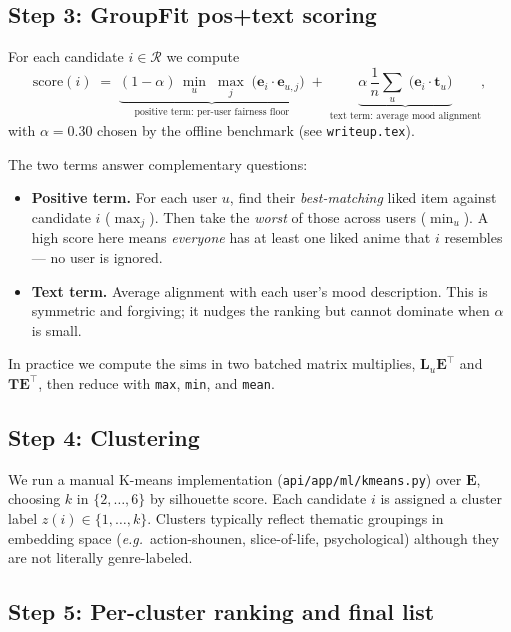 \documentclass[11pt]{article}
\begin{document}
\subsection{Step 3: GroupFit pos+text scoring}

For each candidate $i \in \mathcal{R}$ we compute
\begin{equation}
  \mathrm{score}(i) \;=\;
  \underbrace{(1 - \alpha)\,\min_{u}\;\max_{j}\;\bigl(\mathbf{e}_i \cdot \mathbf{e}_{u,j}\bigr)}_{\text{positive term: per-user fairness floor}}
  \;+\;
  \underbrace{\alpha\,\frac{1}{n}\sum_{u}\;\bigl(\mathbf{e}_i \cdot \mathbf{t}_u\bigr)}_{\text{text term: average mood alignment}},
  \label{eq:groupfit}
\end{equation}
with $\alpha = 0.30$ chosen by the offline benchmark (see
\texttt{writeup.tex}).

The two terms answer complementary questions:
\begin{itemize}[leftmargin=2em]
  \item \textbf{Positive term.} For each user $u$, find their
        \emph{best-matching} liked item against candidate $i$
        ($\max_j$). Then take the \emph{worst} of those across users
        ($\min_u$). A high score here means \emph{everyone} has at least
        one liked anime that $i$ resembles --- no user is ignored.
  \item \textbf{Text term.} Average alignment with each user's mood
        description. This is symmetric and forgiving; it nudges the
        ranking but cannot dominate when $\alpha$ is small.
\end{itemize}

In practice we compute the sims in two batched matrix multiplies,
$\mathbf{L}_u \mathbf{E}^\top$ and $\mathbf{T} \mathbf{E}^\top$, then
reduce with \texttt{max}, \texttt{min}, and \texttt{mean}.

\subsection{Step 4: Clustering}

We run a manual K-means implementation
(\texttt{api/app/ml/kmeans.py}) over $\mathbf{E}$, choosing $k$ in
$\{2, \dots, 6\}$ by silhouette score. Each candidate $i$ is assigned a
cluster label $z(i) \in \{1, \dots, k\}$. Clusters typically reflect
thematic groupings in embedding space (\textit{e.g.\,} action-shounen,
slice-of-life, psychological) although they are not literally
genre-labeled.

\subsection{Step 5: Per-cluster ranking and final list}
\end{document}
